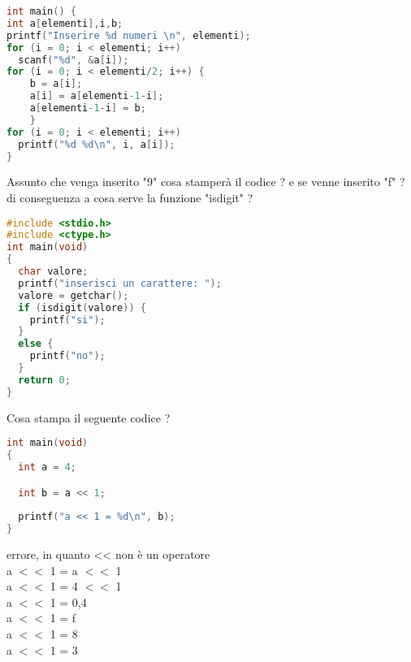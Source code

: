 \documentclass[addpoints,11pt]{exam}
\begin{document}
\begin{questions}
\begin{minipage}[t]{0.5\linewidth}
\begin{lstlisting}[language=C]
int main() { 
int a[elementi],i,b; 
printf("Inserire %d numeri \n", elementi); 
for (i = 0; i < elementi; i++) 
  scanf("%d", &a[i]); 
for (i = 0; i < elementi/2; i++) { 
    b = a[i]; 
    a[i] = a[elementi-1-i]; 
    a[elementi-1-i] = b; 
    } 
for (i = 0; i < elementi; i++) 
  printf("%d %d\n", i, a[i]); 
}
\end{lstlisting}
\end{minipage}
\begin{minipage}[t]{0.5\linewidth}
  \makeemptybox{180pt}
\end{minipage}


\question[2]
Assunto che venga inserito "9" cosa stamperà il codice ? e se venne inserito "f" ? di conseguenza a cosa serve la funzione "isdigit" ? \\
\begin{minipage}[t]{0.5\linewidth}
\begin{lstlisting}[language=C]
#include <stdio.h>
#include <ctype.h>
int main(void)
{
  char valore;
  printf("inserisci un carattere: ");
  valore = getchar();
  if (isdigit(valore)) {
    printf("si");
  }
  else {
    printf("no");
  }
  return 0;
}
\end{lstlisting}
\end{minipage}
\begin{minipage}[t]{0.5\linewidth}
  \makeemptybox{180pt}
\end{minipage}
\newpage

\question[2]
Cosa stampa il seguente codice ?

\begin{lstlisting}[language=C]
int main(void)
{
  int a = 4;

  int b = a << 1;
  
  printf("a << 1 = %d\n", b);
}
\end{lstlisting}
\begin{oneparcheckboxes}
	\choice errore, in quanto << non è un operatore\\
	\choice a $<<$ 1 = a $<<$ 1 \\
	\choice a $<<$ 1 = 4 $<<$ 1 \\
	\choice a $<<$ 1 = 0,4\\
	\choice a $<<$ 1 = f\\
	\choice a $<<$ 1 = 8\\
	\choice a $<<$ 1 = 3\\
\end{oneparcheckboxes}


\end{questions}
\end{document}
